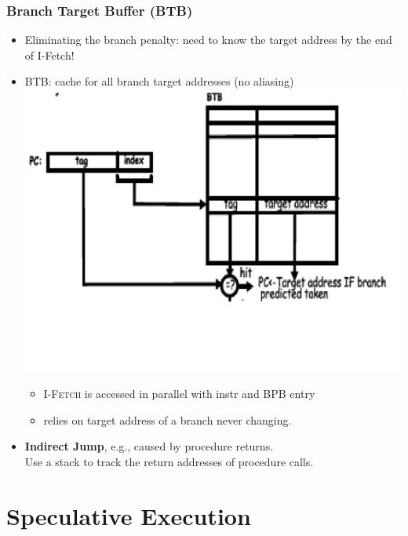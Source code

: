 \documentclass{beamer}
\newcommand{\emp}[1]{\textcolor{DikuRed}{ #1}}
\begin{document}
\begin{frame}[fragile,t]
\frametitle{Branch Target Buffer (BTB)}


\begin{itemize}
    \item Eliminating the branch penalty: need to know the target address
            by the end of I-Fetch!
    \item BTB: cache for all branch target addresses (no aliasing)\\

\includegraphics[width=44ex]{FigsOoOProc/BTB.pdf}\pause\vspace{-10ex}
 
    \begin{itemize}
        \item \textsc{I-Fetch} is accessed in parallel with instr and BPB entry
        \item relies on target address of a branch never changing.
    \end{itemize}\medskip
    \item \emp{\bf Indirect Jump}, e.g., caused by procedure returns.\\
            Use a stack to track the return addresses of procedure calls.
\end{itemize}
\end{frame}

\section{Speculative Execution}

\begin{frame}[fragile]
	\tableofcontents[currentsection]
\end{frame}
\end{document}

